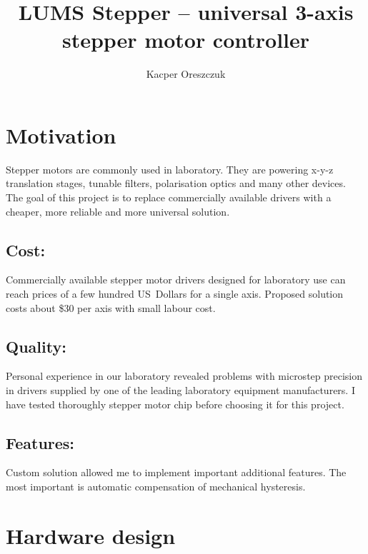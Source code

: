 \documentclass[10pt,article]{article}
\title{LUMS Stepper -- universal 3-axis stepper motor controller}
\author{Kacper Oreszczuk}
\date{}
\begin{document}
\maketitle
\section{Motivation}
Stepper motors are commonly used in laboratory. They are powering x-y-z translation stages, tunable filters, polarisation optics and many other devices. The goal of this project is to replace commercially available drivers with a cheaper, more reliable and more universal solution. 

\subsection*{Cost:}
Commercially available stepper motor drivers designed for laboratory use can reach prices
of a few hundred US\ Dollars for a single axis. Proposed solution costs about \$30 per axis with small
labour cost.

\subsection*{Quality:}
Personal experience in our laboratory revealed problems with microstep precision in drivers supplied by one of the leading laboratory equipment manufacturers. I have tested thoroughly stepper motor chip before choosing it for this project. 
\subsection*{Features:}
Custom solution allowed me to implement important additional features. The most important is automatic compensation of mechanical hysteresis.

\section{Hardware design}
\end{document}
